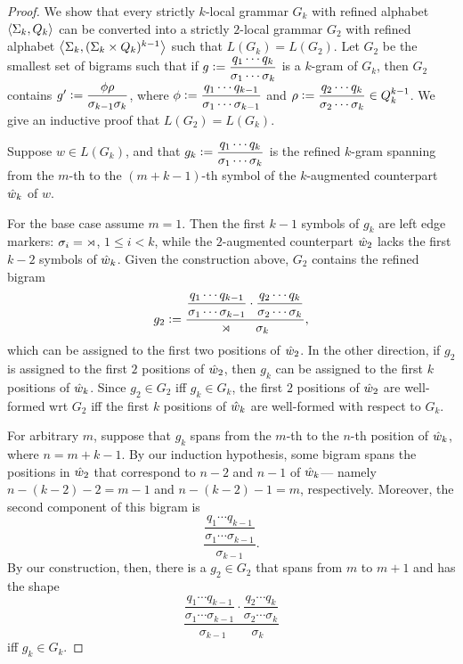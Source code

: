 \begin{proof}
    We show that every strictly $k$-local grammar $G_k$ with refined alphabet $\left \langle \Sigma_k,Q_k \right \rangle $ can be converted into a strictly $2$-local grammar $G_2$ with refined alphabet $\left \langle \Sigma_k,(\Sigma_k \times Q_k)^{k-1} \right \rangle $ such that $L(G_k) = L(G_2)$.
    Let $G_2$ be the smallest set of bigrams such that if $g \mathrel{\mathop:}= \dfrac{q_1 \cdots q_k}{\sigma_1 \cdots \sigma_k}$ is a $k$-gram of $G_k$, then $G_2$ contains $g' \mathrel{\mathop:}= \dfrac{\phi \rho}{\sigma_{k-1} \sigma_k}$, where $\phi \mathrel{\mathop:}= \dfrac{q_1 \cdots q_{k-1}}{\sigma_1 \cdots \sigma_{k-1}}$ and $\rho \mathrel{\mathop:}= \dfrac{q_2 \cdots q_k}{\sigma_2 \cdots \sigma_k} \in Q_k^{k-1}$.
    We give an inductive proof that $L(G_2) = L(G_k)$.

    Suppose $w \in L(G_k)$, and that $g_k \mathrel{\mathop:}= \dfrac{q_1 \cdots q_k}{\sigma_1 \cdots \sigma_k}$ is the refined $k$-gram spanning from the $m$-th to the $(m+k-1)$-th symbol of the $k$-augmented counterpart $\hat{w}_k$ of $w$.

    For the base case assume $m = 1$.
    Then the first $k-1$ symbols of $g_k$ are left edge markers: $\sigma_i = \rtimes$, $1 \leq i < k$, while the $2$-augmented counterpart $\hat{w}_2$ lacks the first $k-2$ symbols of $\hat{w}_k$.
    Given the construction above, $G_2$ contains the refined bigram
    \[
        g_2 \mathrel{\mathop:}= 
        \dfrac{
            \dfrac{
                q_1 \cdots q_{k-1}}
                {\sigma_1 \cdots \sigma_{k-1}}
            \cdot
            \dfrac{
                q_2 \cdots q_k}
                {\sigma_2 \cdots \sigma_k}
            }
            {\rtimes\qquad \sigma_k},
    \]
    which can be assigned to the first two positions of $\hat{w}_2$.
    In the other direction, if $g_2$ is assigned to the first $2$ positions of $\hat{w}_2$, then $g_k$ can be assigned to the first $k$ positions of $\hat{w}_k$.
    Since $g_2 \in G_2$ iff $g_k \in G_k$, the first $2$ positions of $\hat{w}_2$ are well-formed wrt $G_2$ iff the first $k$ positions of $\hat{w}_k$ are well-formed with respect to $G_k$.

    For arbitrary $m$, suppose that $g_k$ spans from the $m$-th to the $n$-th position of $\hat{w}_k$, where $n = m + k - 1$.
    By our induction hypothesis, some bigram spans the positions in $\hat{w}_2$ that correspond to $n - 2$ and $n - 1$ of $\hat{w}_k$--- namely $n - (k - 2) - 2 = m - 1$ and $n - (k - 2) - 1 = m$, respectively.
    Moreover, the second component of this bigram is
    \[
        \dfrac{
            \dfrac{
                q_1 \cdots q_{k-1}}
                {\sigma_1 \cdots \sigma_{k-1}}
            }
            {\sigma_{k-1}}
            .
    \]
    By our construction, then, there is a $g_2 \in G_2$ that spans from $m$ to $m+1$ and has the shape
    \[
        \dfrac{
            \dfrac{
                q_1 \cdots q_{k-1}}
                {\sigma_1 \cdots \sigma_{k-1}}
            \cdot
            \dfrac{
                q_2 \cdots q_k}
                {\sigma_2 \cdots \sigma_k}
            }
            {\sigma_{k-1}\qquad \sigma_k}
    \]
    iff $g_k \in G_k$.
\end{proof}

